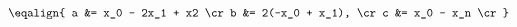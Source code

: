\hsize 0pt
\vsize 0pt
\nopagenumbers
\overfullrule 0pt
\noindent
$$
\eqalign{    a &= x_0 - 2x_1 + x2 \cr    b &= 2(-x_0 + x_1), \cr    c &= x_0 - x_n \cr}
$$
\bye